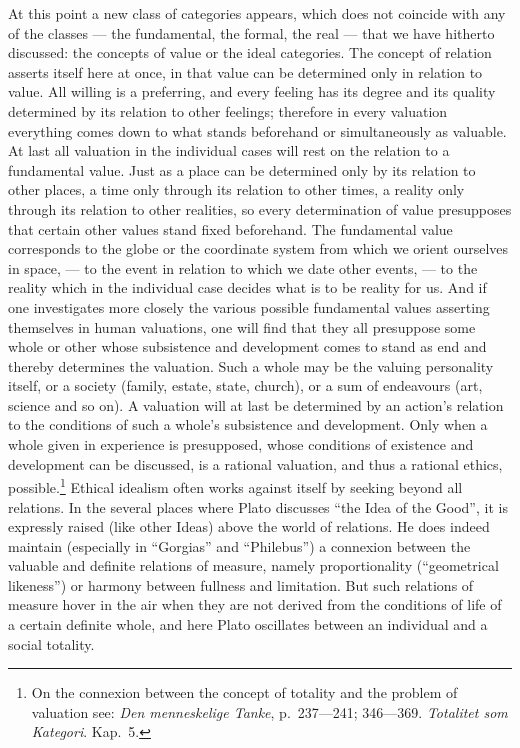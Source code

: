 \documentclass[12pt]{article}
\newcommand{\opage}[1]{\marginnote{\footnotesize\textit{[#1]}}}
\begin{document}
At this point a new class of categories appears, which does not coincide
with any of the classes --- the fundamental, the formal, the real --- that
we have hitherto discussed: the concepts of value or the ideal categories.
The concept of relation asserts itself here at once, in that value can be
determined only in relation to value. All willing is a preferring, and every
feeling has its degree and its quality determined by its relation to other
feelings; therefore in every valuation everything comes down to what stands
beforehand or simultaneously as valuable. At last all valuation in the
individual cases will rest on the relation to a fundamental value. Just as a
place can be determined only by its relation to other places, a time only
through its relation to other times, a reality only through its relation to
other realities, so every determination of value presupposes that certain
other values stand fixed beforehand. The fundamental value corresponds to
the globe or the coordinate system from which we orient ourselves in space,
--- to the event in relation to which we date other events, --- to the
reality which in the individual case decides what is to be reality for us.
And if one investigates more closely the various possible fundamental values
asserting themselves in human valuations, one will find that they all
presuppose some whole or other whose subsistence and development comes to
stand as end and thereby determines the valuation. Such a whole may be the
valuing personality itself, or a society (family, estate, state, church), or
a sum of endeavours (art, science and so on). A valuation will at last be
determined \opage{83}by an action's relation to the conditions of such a whole's
subsistence and development. Only when a whole given in experience is
presupposed, whose conditions of existence and development can be discussed,
is a rational valuation, and thus a rational ethics, possible.\footnote{On
the connexion between the concept of totality and the problem of valuation
see: \textit{Den menneskelige Tanke}, p.~237---241; 346---369.
\textit{Totalitet som Kategori}. Kap.~5.} Ethical idealism often works
against itself by seeking beyond all relations. In the several places where
Plato discusses ``the Idea of the Good'', it is expressly raised (like other
Ideas) above the world of relations. He does indeed maintain (especially in
``Gorgias'' and ``Philebus'') a connexion between the valuable and definite
relations of measure, namely proportionality (``geometrical likeness'') or
harmony between fullness and limitation. But such relations of measure hover
in the air when they are not derived from the conditions of life of a
certain definite whole, and here Plato oscillates between an individual and
a social totality.
\end{document}
